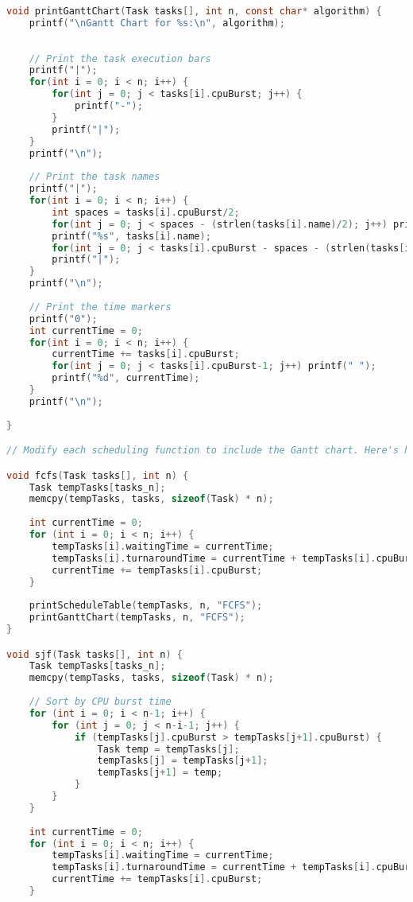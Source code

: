 \documentclass{article}
\begin{document}
\begin{lstlisting}[language=C, caption=Scheduling Code ]
void printGanttChart(Task tasks[], int n, const char* algorithm) {
    printf("\nGantt Chart for %s:\n", algorithm);
  
    
    // Print the task execution bars
    printf("|");
    for(int i = 0; i < n; i++) {
        for(int j = 0; j < tasks[i].cpuBurst; j++) {
            printf("-");
        }
        printf("|");
    }
    printf("\n");
    
    // Print the task names
    printf("|");
    for(int i = 0; i < n; i++) {
        int spaces = tasks[i].cpuBurst/2;
        for(int j = 0; j < spaces - (strlen(tasks[i].name)/2); j++) printf(" ");
        printf("%s", tasks[i].name);
        for(int j = 0; j < tasks[i].cpuBurst - spaces - (strlen(tasks[i].name) - strlen(tasks[i].name)/2); j++) printf(" ");
        printf("|");
    }
    printf("\n");
    
    // Print the time markers
    printf("0");
    int currentTime = 0;
    for(int i = 0; i < n; i++) {
        currentTime += tasks[i].cpuBurst;
        for(int j = 0; j < tasks[i].cpuBurst-1; j++) printf(" ");
        printf("%d", currentTime);
    }
    printf("\n");
   
}

// Modify each scheduling function to include the Gantt chart. Here's how to update them:

void fcfs(Task tasks[], int n) {
    Task tempTasks[tasks_n];
    memcpy(tempTasks, tasks, sizeof(Task) * n);
    
    int currentTime = 0;
    for (int i = 0; i < n; i++) {
        tempTasks[i].waitingTime = currentTime;
        tempTasks[i].turnaroundTime = currentTime + tempTasks[i].cpuBurst;
        currentTime += tempTasks[i].cpuBurst;
    }
    
    printScheduleTable(tempTasks, n, "FCFS");
    printGanttChart(tempTasks, n, "FCFS");
}

void sjf(Task tasks[], int n) {
    Task tempTasks[tasks_n];
    memcpy(tempTasks, tasks, sizeof(Task) * n);
    
    // Sort by CPU burst time
    for (int i = 0; i < n-1; i++) {
        for (int j = 0; j < n-i-1; j++) {
            if (tempTasks[j].cpuBurst > tempTasks[j+1].cpuBurst) {
                Task temp = tempTasks[j];
                tempTasks[j] = tempTasks[j+1];
                tempTasks[j+1] = temp;
            }
        }
    }
    
    int currentTime = 0;
    for (int i = 0; i < n; i++) {
        tempTasks[i].waitingTime = currentTime;
        tempTasks[i].turnaroundTime = currentTime + tempTasks[i].cpuBurst;
        currentTime += tempTasks[i].cpuBurst;
    }
    

\end{lstlisting}
\end{document}
